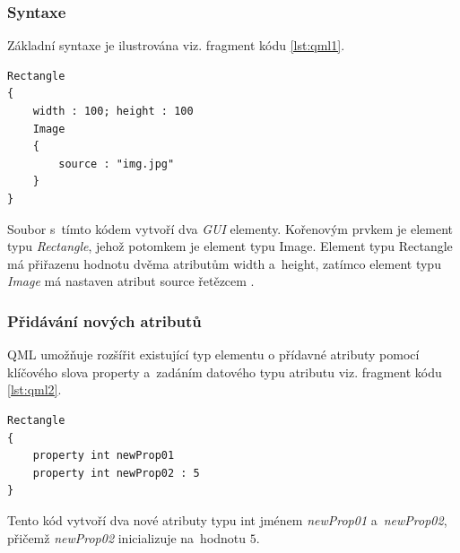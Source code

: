 \documentclass[11pt,twoside,a4paper]{book}
\begin{document}
\subsubsection{Syntaxe}
Základní syntaxe je ilustrována viz. fragment kódu \ref{lst:qml1}.
\begin{lstlisting}[float,frame=single,caption=Tvorba dvou jednoduchých elementů pomocí jazyka \textit{QML}.,label=Tvorba dvou jednoduchých elementů pomocí jazyka \textit{QML}.,label=lst:qml1]
Rectangle
{
	width : 100; height : 100
	Image
	{
		source : "img.jpg"
	}
}
\end{lstlisting}
Soubor s~tímto kódem vytvoří dva \textit{GUI} elementy. Kořenovým prvkem je element typu \textit{Rectangle}, jehož potomkem je element typu Image. Element typu Rectangle má přiřazenu hodnotu dvěma atributům width a~height, zatímco element typu \textit{Image} má nastaven atribut source řetězcem .

\subsubsection{Přidávání nových atributů}
QML umožňuje rozšířit existující typ elementu o přídavné atributy pomocí klíčového slova property a~zadáním  datového typu atributu viz. fragment kódu \ref{lst:qml2}.
\begin{lstlisting}[frame=single,caption=Ukázka deklarace dvou nových atributů.,label=lst:qml2]
Rectangle
{
	property int newProp01
	property int newProp02 : 5
}
\end{lstlisting}
Tento kód vytvoří dva nové atributy typu int jménem \textit{newProp01} a~\textit{newProp02}, přičemž \textit{newProp02} inicializuje na~hodnotu $5$.
\end{document}
